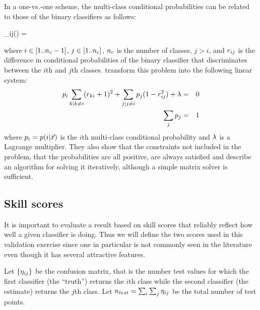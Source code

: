 In a one-vs.-one scheme, the multi-class conditional probabilities 
can be related to those of the binary classifiers as follows:
\begin{eqnnon}
	\diffcondprob_{ij}(\point) = 
	\label{bin2multi}
\end{eqnnon}
where $i \in [1..n_c-1]$, $j \in [1..n_c]$, $n_c$ is the number of classes, $j>i$,
and $r_{ij}$ is the difference in conditional probabilities of
the binary classifier that discriminates between the $i$th and $j$th classes.
\citet{Wu_etal2004} transform this problem into the following linear system:
\begin{eqnarray}
	p_i \sum_{k|k \ne i} (r_{ki} + 1)^2 +
	\sum_{j|j \ne i} p_j (1 - r_{ij}^2) + \lambda & = & 0 \\ \nonumber
	\sum_j p_j & = & 1
	\label{multiclass}
\end{eqnarray}
where $p_i = p(i | \vec {x})$ is the $i$th multi-class 
conditional probability and $\lambda$ is a Lagrange multiplier.
They also show that the constraints not included in the problem, that
the probabilities are all positive, are always satisfied
and describe an algorithm for solving it iteratively, although a
simple matrix solver is sufficient.

\subsection{Skill scores}

\label{skill_scores}

It is important to evaluate a result based on skill scores that reliably reflect
how well a given classifier is doing.
Thus we will define the two scores used in this validation exercise 
since one in particular is not commonly seen in the literature even though it has several
attractive features.

Let $\lbrace \eta_{ij} \rbrace$ be the confusion matrix, that is the number
test values for which the first classifier (the ``truth'') returns the $i$th class
while the second classifier (the estimate) returns the $j$th class.
Let $n_{test}=\sum_i \sum_j \eta_{ij}$ be the total number of test points.

